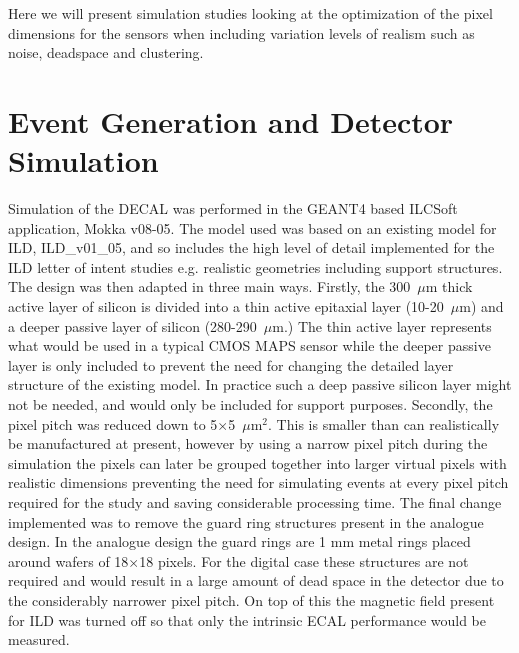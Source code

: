 Here we will present simulation studies looking at the optimization of the pixel dimensions for the sensors when including variation levels of realism such as noise, deadspace and clustering.  

\section{Event Generation and Detector Simulation}


Simulation of the \ac{DECAL} was performed in the GEANT4 based ILCSoft application, Mokka v08-05. The model used was based on an existing model for \ac{ILD}, ILD\_v01\_05, and so includes the high level of detail implemented for the \ac{ILD} letter of intent studies\cite{ILD} e.g. realistic geometries including support structures. The design was then adapted in three main ways. Firstly, the 300~$\mu$m thick active layer of silicon is divided into a thin active epitaxial layer (10-20~$\mu$m) and a deeper passive layer of silicon (280-290~$\mu$m.) The thin active layer represents what would be used in a typical \ac{CMOS} \ac{MAPS} sensor while the deeper passive layer is only included to prevent the need for changing the detailed layer structure of the existing model. In practice such a deep passive silicon layer might not be needed, and would only be included for support purposes. Secondly, the pixel pitch was reduced down to 5$\times$5~$\mu$m$^2$. This is smaller than can realistically be manufactured at present, however by using a narrow pixel pitch during the simulation the pixels can later be grouped together into larger virtual pixels with realistic dimensions preventing the need for simulating events at every pixel pitch required for the study and saving considerable processing time. The final change implemented was to remove the guard ring structures present in the analogue design. In the analogue design the guard rings are 1 mm metal rings placed around wafers of 18$\times$18 pixels. For the digital case these structures are not required and would result in a large amount of dead space in the detector due to the considerably narrower pixel pitch. On top of this the magnetic field present for \ac{ILD} was turned off so that only the intrinsic \ac{ECAL} performance would be measured.

